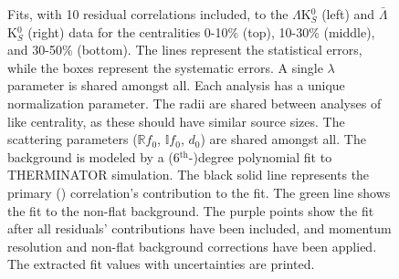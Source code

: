 \documentclass[../AnalysisNoteJBuxton.tex]{subfiles}
\renewcommand{\ResNum}{_10Res}
\renewcommand{\SaveNameModLamKs}{\MomRes\NonFlatBgd\ResNum\PrimMaxDecay\ResMethod\ParamFixAndShareLamKs}
\begin{document}
\pagestyle{empty}
\begin{landscape}

\begin{figure}[h!]
  \centering
  \caption[$\Lambda$K$^{0}_{S}$($\bar{\Lambda}$K$^{0}_{S}$) Fits with 10 Residuals]{Fits, with 10 residual correlations included, to the $\Lambda$K$^{0}_{S}$ (left) and $\bar{\Lambda}$K$^{0}_{S}$ (right) data for the centralities 0-10\% (top), 10-30\% (middle), and 30-50\% (bottom).
 The lines represent the statistical errors, while the boxes represent the systematic errors.
 A single $\lambda$ parameter is shared amongst all.
 Each analysis has a unique normalization parameter.
 The radii are shared between analyses of like centrality, as these should have similar source sizes.
 The scattering parameters ($\mathbb{R}f_{0}$, $\mathbb{I}f_{0}$, $d_{0}$) are shared amongst all.
 The background is modeled by a (6$^{\mathrm{th}}$-)degree polynomial fit to THERMINATOR simulation.
 The black solid line represents the primary (\LamK) correlation's contribution to the fit.  
 The green line shows the fit to the non-flat background.
 The purple points show the fit after all residuals' contributions have been included, and momentum resolution and non-flat background corrections have been applied.
 The extracted fit values with uncertainties are printed.}
  \label{fig:LamK0wConjFits_10Res}
\end{figure}



\end{landscape}
\end{document}
